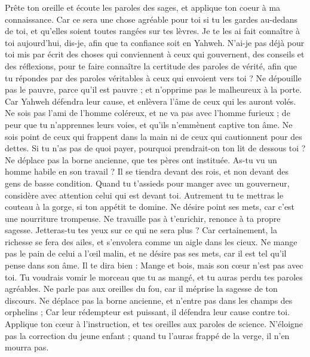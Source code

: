 \begin{multicols}{2}
Prête ton oreille et écoute les paroles des sages, et applique ton coeur à ma connaissance.
Car ce sera une chose agréable pour toi si tu les gardes au-dedans de toi, et qu'elles soient toutes rangées sur tes lèvres.
Je te les ai fait connaître à toi aujourd'hui, dis-je, afin que ta confiance soit en Yahweh.
N'ai-je pas déjà pour toi mis par écrit des choses qui conviennent à ceux qui gouvernent, des conseils et des réflexions,
pour te faire connaître la certitude des paroles de vérité, afin que tu répondes par des paroles véritables à ceux qui envoient vers toi ?
Ne dépouille pas le pauvre, parce qu'il est pauvre ; et n'opprime pas le malheureux à la porte.
Car Yahweh défendra leur cause, et enlèvera l'âme de ceux qui les auront volés.
Ne sois pas l'ami de l'homme coléreux, et ne va pas avec l'homme furieux ;
de peur que tu n'apprennes leurs voies, et qu'ils n'emmènent captive ton âme.
Ne sois point de ceux qui frappent dans la main ni de ceux qui cautionnent pour des dettes.
Si tu n'as pas de quoi payer, pourquoi prendrait-on ton lit de dessous toi ?
Ne déplace pas la borne ancienne, que tes pères ont instituée.
As-tu vu un homme habile en son travail ? Il se tiendra devant des rois, et non devant des gens de basse condition.
\VerseOne{}Quand tu t'assieds pour manger avec un gouverneur, considère avec attention celui qui est devant toi.
Autrement tu te mettras le couteau à la gorge, si ton appétit te domine.
Ne désire point ses mets, car c'est une nourriture trompeuse.
Ne travaille pas à t'enrichir, renonce à ta propre sagesse.
Jetteras-tu tes yeux sur ce qui ne sera plus ? Car certainement, la richesse se fera des ailes, et s'envolera comme un aigle dans les cieux.
Ne mange pas le pain de celui a l’œil malin, et ne désire pas ses mets,
car il est tel qu'il pense dans son âme. Il te dira bien : Mange et bois, mais son cœur n'est pas avec toi.
Tu voudrais vomir le morceau que tu as mangé, et tu auras perdu tes paroles agréables.
Ne parle pas aux oreilles du fou, car il méprise la sagesse de ton discours.
Ne déplace pas la borne ancienne, et n'entre pas dans les champs des orphelins ;
Car leur rédempteur est puissant, il défendra leur cause contre toi.
Applique ton cœur à l'instruction, et tes oreilles aux paroles de science.
N'éloigne pas la correction du jeune enfant ; quand tu l'auras frappé de la verge, il n'en mourra pas.

\end{multicols}
